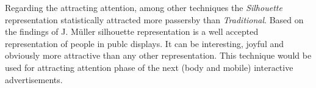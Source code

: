 Regarding the attracting attention, among other techniques the \emph{Silhouette} representation statistically attracted more passersby than \emph{Traditional}. Based on the findings of J. Müller\cite{LookingGlass} silhouette representation is a well accepted representation of people in publc displays. It can be interesting, joyful and obviously more attractive than any other representation. This technique would be used for attracting attention phase of the next (body and mobile) interactive advertisements.






